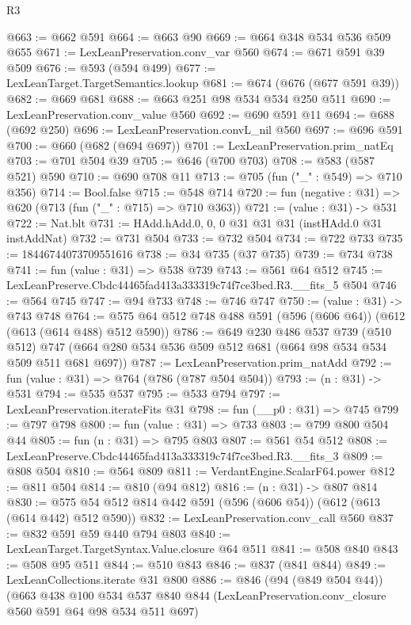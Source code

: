 \begin{lexlean}{R3}
\begin{coremodule}
@663 := @662 @591
@664 := @663 @90
@669 := @664 @348 @534 @536 @509 @655
@671 := LexLeanPreservation.conv_var @560
@674 := @671 @591 @39 @509
@676 := @593 (@594 @499)
@677 := LexLeanTarget.TargetSemantics.lookup
@681 := @674 (@676 (@677 @591 @39))
@682 := @669 @681
@688 := @663 @251 @98 @534 @534 @250 @511
@690 := LexLeanPreservation.conv_value @560
@692 := @690 @591 @11
@694 := @688 (@692 @250)
@696 := LexLeanPreservation.convL_nil @560
@697 := @696 @591
@700 := @660 (@682 (@694 @697))
@701 := LexLeanPreservation.prim_natEq
@703 := @701 @504 @39
@705 := @646 (@700 @703)
@708 := @583 (@587 @521) @590
@710 := @690 @708 @11
@713 := @705 (fun ("_" : @549) => @710 @356)
@714 := Bool.false
@715 := @548 @714
@720 := fun (negative : @31) => @620 (@713 (fun ("_" : @715) => @710 @363))
@721 := (value : @31) -> @531
@722 := Nat.blt
@731 := HAdd.hAdd.{0, 0, 0} @31 @31 @31 (instHAdd.{0} @31 instAddNat)
@732 := @731 @504
@733 := @732 @504
@734 := @722 @733
@735 := 18446744073709551616
@738 := @34 @735 (@37 @735)
@739 := @734 @738
@741 := fun (value : @31) => @538 @739
@743 := @561 @64 @512
@745 := LexLeanPreserve.Cbdc44465fad413a333319c74f7ce3bed.R3.__fits_5 @504
@746 := @564 @745
@747 := @94 @733
@748 := @746 @747
@750 := (value : @31) -> @743 @748
@764 := @575 @64 @512 @748 @488 @591 (@596 (@606 @64)) (@612 (@613 (@614 @488) @512 @590))
@786 := @649
    @230
    @486
    @537
    @739
    (@510 @512)
    @747
    (@664 @280 @534 @536 @509 @512 @681 (@664 @98 @534 @534 @509 @511 @681 @697))
@787 := LexLeanPreservation.prim_natAdd
@792 := fun (value : @31) => @764 (@786 (@787 @504 @504))
@793 := (n : @31) -> @531
@794 := @535 @537
@795 := @533 @794
@797 := LexLeanPreservation.iterateFits @31
@798 := fun (__p0 : @31) => @745
@799 := @797 @798
@800 := fun (value : @31) => @733
@803 := @799 @800 @504 @44
@805 := fun (n : @31) => @795 @803
@807 := @561 @54 @512
@808 := LexLeanPreserve.Cbdc44465fad413a333319c74f7ce3bed.R3.__fits_3
@809 := @808 @504
@810 := @564 @809
@811 := VerdantEngine.ScalarF64.power
@812 := @811 @504
@814 := @810 (@94 @812)
@816 := (n : @31) -> @807 @814
@830 := @575 @54 @512 @814 @442 @591 (@596 (@606 @54)) (@612 (@613 (@614 @442) @512 @590))
@832 := LexLeanPreservation.conv_call @560
@837 := @832 @591 @59 @440 @794 @803
@840 := LexLeanTarget.TargetSyntax.Value.closure @64 @511
@841 := @508 @840
@843 := @508 @95 @511
@844 := @510 @843
@846 := @837 (@841 @844)
@849 := LexLeanCollections.iterate @31 @800
@886 := @846
    (@94 (@849 @504 @44))
    (@663
      @438
      @100
      @534
      @537
      @840
      @844
      (LexLeanPreservation.conv_closure @560 @591 @64 @98 @534 @511 @697)

\end{coremodule}
\end{lexlean}
